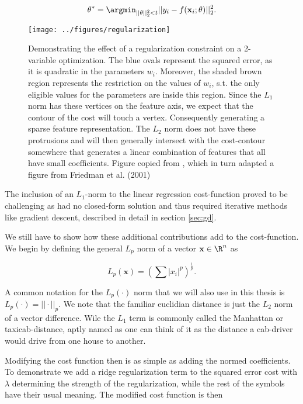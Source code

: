 \begin{align}
\theta^* = \argmin_{||\theta||_2^2<t} ||y_i - f(\mathbf{x}_i; \theta)||_2^2.
\end{align}

\begin{figure}
\centering
\texttt{[image: ../figures/regularization]}
\caption[Geometric interpretation of the $L_1$ and $L_2$ regularization and the squared error cost]{Demonstrating the effect of a regularization constraint on a 2-variable optimization. The blue ovals represent the squared error, as it is quadratic in the parameters $w_i$. Moreover, the shaded brown region represents the restriction on the values of $w_i$, s.t. the only eligible values for the parameters are inside this region. Since the $L_1$ norm has these vertices on the feature axis, we expect that the contour of the cost will touch a vertex. Consequently generating a sparse feature representation. The $L_2$ norm does not have these protrusions and will then generally intersect with the cost-contour somewhere that generates a linear combination of features that all have small coefficients. Figure copied from \citet{Mehta2019}, which in turn adapted a figure from Friedman et al. (2001)}\label{fig:regularization}
\end{figure}

The inclusion of an $L_1$-norm to the linear regression cost-function proved to be challenging as had no closed-form solution and thus required iterative methods like gradient descent, described in detail in section \ref{sec:gd}. 

We still have to show how these additional contributions add to the cost-function. We begin by defining the general $L_p$ norm of a vector $\mathbf{x} \in \R^n$ as

\begin{equation}
L_p(\mathbf{x}) = \left(\sum |x_i|^p\right)^{\frac{1}{p}}.
\end{equation}

\noindent A common notation for the $L_p(\cdot)$ norm that we will also use in this thesis is $L_p(\cdot) = ||\cdot||_p$. We note that the familiar euclidian distance is just the $L_2$ norm of a vector difference. Wile the $L_1$ term is commonly called the Manhattan or taxicab-distance, aptly named as one can think of it as the distance a cab-driver would drive from one house to another.

Modifying the cost function then is as simple as adding the normed coefficients. To demonstrate we add a ridge regularization term to the squared error cost with $\lambda$ determining the strength of the regularization, while the rest of the symbols have their usual meaning. The modified cost function is then

